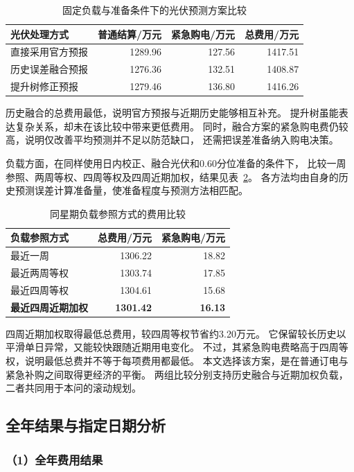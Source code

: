 \begin{table}[H]
\centering
\caption{固定负载与准备条件下的光伏预测方案比较}
\label{tab:q3_candidate}
\begin{tabular}{lrrr}
\toprule
光伏处理方式 & 普通结算/万元 & 紧急购电/万元 & 总费用/万元\\
\midrule
直接采用官方预报 &1289.96&127.56&1417.51\\
历史误差融合预报 &1276.36&132.51&1408.87\\
提升树修正预报 &1279.46&136.80&1416.26\\
\bottomrule
\end{tabular}
\end{table}

历史融合的总费用最低，说明官方预报与近期历史能够相互补充。
提升树虽能表达复杂关系，却未在该比较中带来更低费用。
同时，融合方案的紧急购电费仍较高，说明仅改善平均预测并不足以防范缺口，
还需把误差准备纳入购电决策。

负载方面，在同样使用日内校正、融合光伏和0.60分位准备的条件下，
比较一周参照、两周等权、四周等权及四周近期加权，结果见表~\ref{tab:q3_load_compare}。
各方法均由自身的历史预测误差计算准备量，使准备程度与预测方法相匹配。

\begin{table}[H]
\centering
\caption{同星期负载参照方式的费用比较}
\label{tab:q3_load_compare}
\begin{tabular}{lrr}
\toprule
负载参照方式 & 总费用/万元 & 紧急购电/万元\\
\midrule
最近一周 &1306.22&18.82\\
最近两周等权 &1303.74&17.85\\
最近四周等权 &1304.61&15.68\\
\textbf{最近四周近期加权} &\textbf{1301.42}&\textbf{16.13}\\
\bottomrule
\end{tabular}
\end{table}

四周近期加权取得最低总费用，较四周等权节省约3.20万元。
它保留较长历史以平滑单日异常，又能较快跟随近期用电变化。
不过，其紧急购电费略高于四周等权，说明最低总费并不等于每项费用都最低。
本文选择该方案，是在普通订电与紧急补购之间取得更经济的平衡。
两组比较分别支持历史融合与近期加权负载，二者共同用于本问的滚动规划。

\subsection{全年结果与指定日期分析}

\subsubsection*{（1）全年费用结果}

